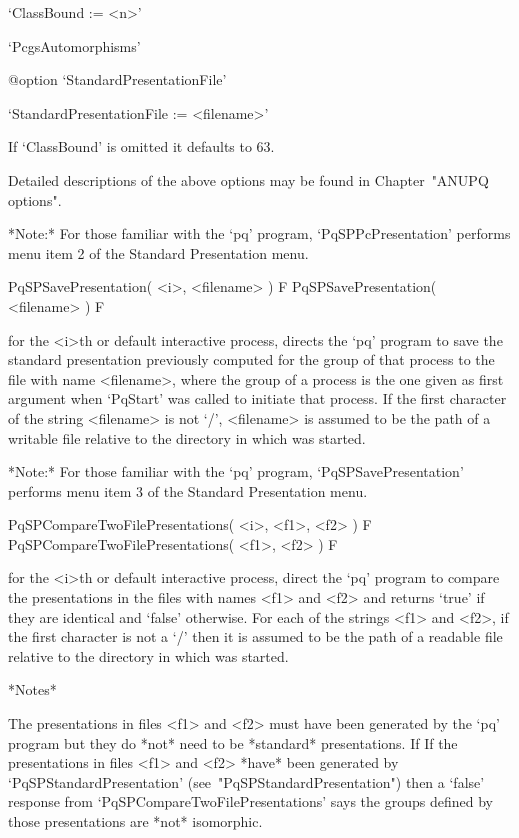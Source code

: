 \beginlist%

\item{}`ClassBound := <n>'

\item{}`PcgsAutomorphisms'

%
{@option \noexpand`StandardPresentationFile'}
\item{}`StandardPresentationFile := <filename>'

\endlist

If `ClassBound' is omitted it defaults to 63.

Detailed descriptions of the above options may be found in Chapter~"ANUPQ
options".

*Note:* For those familiar with  the  `pq'  program,  `PqSPPcPresentation'
performs menu item 2 of the Standard Presentation menu.

\>PqSPSavePresentation( <i>, <filename> ) F
\>PqSPSavePresentation( <filename> ) F

for the <i>th or default interactive {\ANUPQ} process, directs  the  `pq'
program to save the standard  presentation  previously  computed  for  the
group of that process to the file with name <filename>, where  the  group
of a process is the one given as first argument when `PqStart' was called
to initiate that process. If the first character of the string <filename>
is not `/', <filename> is assumed to be  the  path  of  a  writable  file
relative to the directory in which {\GAP} was started.

*Note:* For those familiar with the `pq'  program,  `PqSPSavePresentation'
performs menu item 3 of the Standard Presentation menu.

\>PqSPCompareTwoFilePresentations( <i>, <f1>, <f2> ) F
\>PqSPCompareTwoFilePresentations( <f1>, <f2> ) F

for the <i>th or default interactive {\ANUPQ} process, direct  the  `pq'
program to compare the presentations in the files with names <f1> and <f2>
and returns `true' if they are identical and `false' otherwise. For  each
of the strings <f1> and <f2>, if the first character is not a `/' then it
is assumed to be the path of a readable file relative to the directory in
which {\GAP} was started.

*Notes*

The presentations in files <f1> and  <f2> must have been generated by the
`pq' program but they do *not* need to be *standard* presentations. If If
the  presentations  in files  <f1>  and  <f2>  *have* been  generated  by
`PqSPStandardPresentation'    (see~"PqSPStandardPresentation")   then   a
`false' response  from `PqSPCompareTwoFilePresentations' says  the groups
defined by those presentations are *not* isomorphic.

